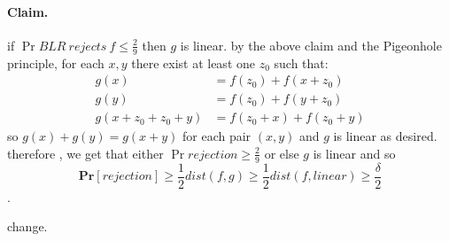\documentclass{article}
\begin{document}
\paragraph{ Claim.} if \( \Pr{ BLR \ rejects \ f  } \le \frac{2}{9} \) then \(g\) is linear. by the above claim and the Pigeonhole principle, for each \(x, y\) there exist at least one \(z_0 \) such that: \[
\begin{split}
    g(x) &= f(z_0) + f(x+z_0) \\
    g(y) &= f(z_0) + f(y+z_0) \\
    g(x+ z_0 + z_0 + y) &= f(z_0 +x) + f(z_0 + y) 
\end{split}\]
so \(g(x) + g(y) = g(x+y) \) for each pair \( (x,y) \) and \(g\) is linear as desired. therefore , we get that either \( \Pr{rejection} \ge \frac{2}{9} \) or else \( g \) is linear and so  
\[ \mathbf{Pr}[rejection] \ge \frac{1}{2} dist(f,g)  \ge \frac{1}{2} dist(f,linear) \ge \frac{\delta }{2}  \].  

change.
\end{document}
